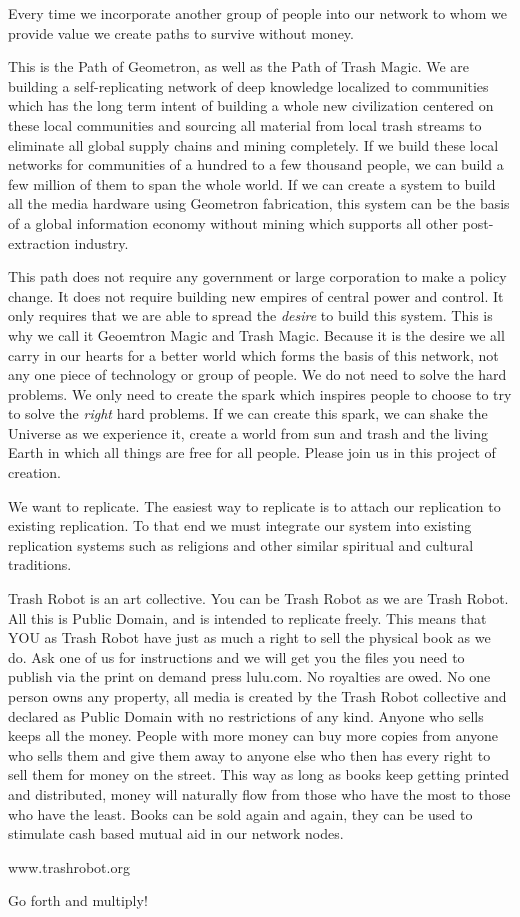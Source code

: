 Every time we incorporate another group of people into our network to
whom we provide value we create paths to survive without money.

This is the Path of Geometron, as well as the Path of Trash Magic. We
are building a self-replicating network of deep knowledge localized to
communities which has the long term intent of building a whole new
civilization centered on these local communities and sourcing all
material from local trash streams to eliminate all global supply chains
and mining completely. If we build these local networks for communities
of a hundred to a few thousand people, we can build a few million of
them to span the whole world. If we can create a system to build all the
media hardware using Geometron fabrication, this system can be the basis
of a global information economy without mining which supports all other
post-extraction industry.

This path does not require any government or large corporation to make a
policy change. It does not require building new empires of central power
and control. It only requires that we are able to spread the
\emph{desire} to build this system. This is why we call it Geoemtron
Magic and Trash Magic. Because it is the desire we all carry in our
hearts for a better world which forms the basis of this network, not any
one piece of technology or group of people. We do not need to solve the
hard problems. We only need to create the spark which inspires people to
choose to try to solve the \emph{right} hard problems. If we can create
this spark, we can shake the Universe as we experience it, create a
world from sun and trash and the living Earth in which all things are
free for all people. Please join us in this project of creation.

We want to replicate. The easiest way to replicate is to attach our
replication to existing replication. To that end we must integrate our
system into existing replication systems such as religions and other
similar spiritual and cultural traditions.

Trash Robot is an art collective. You can be Trash Robot as we are Trash
Robot. All this is Public Domain, and is intended to replicate freely.
This means that YOU as Trash Robot have just as much a right to sell the
physical book as we do. Ask one of us for instructions and we will get
you the files you need to publish via the print on demand press
lulu.com. No royalties are owed. No one person owns any property, all
media is created by the Trash Robot collective and declared as Public
Domain with no restrictions of any kind. Anyone who sells keeps all the
money. People with more money can buy more copies from anyone who sells
them and give them away to anyone else who then has every right to sell
them for money on the street. This way as long as books keep getting
printed and distributed, money will naturally flow from those who have
the most to those who have the least. Books can be sold again and again,
they can be used to stimulate cash based mutual aid in our network
nodes.

www.trashrobot.org

Go forth and multiply!

